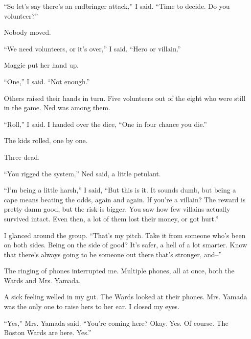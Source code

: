``So let's say there's an endbringer attack,'' I said.  ``Time to decide.  Do you volunteer?''



Nobody moved.



``We need volunteers, or it's over,'' I said.  ``Hero or villain.''



Maggie put her hand up.



``One,'' I said.  ``Not enough.''



Others raised their hands in turn.  Five volunteers out of the eight who were still in the game.  Ned was among them.



``Roll,'' I said.  I handed over the dice, ``One in four chance you die.''



The kids rolled, one by one.



Three dead.



``You rigged the system,'' Ned said, a little petulant.



``I'm being a little harsh,'' I said, ``But this is it.  It sounds dumb, but being a cape means beating the odds, again and again.  If you're a villain?  The reward is pretty damn good, but the risk is bigger.  You saw how few villains actually survived intact.  Even then, a lot of them lost their money, or got hurt.''



I glanced around the group.  ``That's my pitch.  Take it from someone who's been on both sides.  Being on the side of good?  It's safer, a hell of a lot smarter.  Know that there's always going to be someone out there that's stronger, and--''



The ringing of phones interrupted me.  Multiple phones, all at once, both the Wards and Mrs. Yamada.



A sick feeling welled in my gut.  The Wards looked at their phones.  Mrs. Yamada was the only one to raise hers to her ear.  I closed my eyes.



``Yes,'' Mrs. Yamada said.  ``You're coming here?  Okay.  Yes.  Of course.  The Boston Wards are here.  Yes.''



